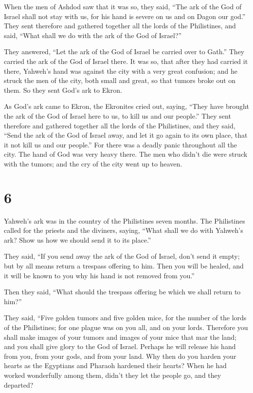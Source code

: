  When the men of Ashdod saw that it was so, they said, ``The
ark of the God of Israel shall not stay with us, for his hand is severe
on us and on Dagon our god.''  They sent therefore and
gathered together all the lords of the Philistines, and said, ``What
shall we do with the ark of the God of Israel?''

They answered, ``Let the ark of the God of Israel be carried over to
Gath.'' They carried the ark of the God of Israel there.  It
was so, that after they had carried it there, Yahweh's hand was against
the city with a very great confusion; and he struck the men of the city,
both small and great, so that tumors broke out on them.  So
they sent God's ark to Ekron.

As God's ark came to Ekron, the Ekronites cried out, saying, ``They have
brought the ark of the God of Israel here to us, to kill us and our
people.''  They sent therefore and gathered together all
the lords of the Philistines, and they said, ``Send the ark of the God
of Israel away, and let it go again to its own place, that it not kill
us and our people.'' For there was a deadly panic throughout all the
city. The hand of God was very heavy there.  The men who
didn't die were struck with the tumors; and the cry of the city went up
to heaven.

\hypertarget{section-5}{%
\section{6}\label{section-5}}

 Yahweh's ark was in the country of the Philistines seven
months.  The Philistines called for the priests and the
diviners, saying, ``What shall we do with Yahweh's ark? Show us how we
should send it to its place.''

 They said, ``If you send away the ark of the God of Israel,
don't send it empty; but by all means return a trespass offering to him.
Then you will be healed, and it will be known to you why his hand is not
removed from you.''

 Then they said, ``What should the trespass offering be
which we shall return to him?''

They said, ``Five golden tumors and five golden mice, for the number of
the lords of the Philistines; for one plague was on you all, and on your
lords.  Therefore you shall make images of your tumors and
images of your mice that mar the land; and you shall give glory to the
God of Israel. Perhaps he will release his hand from you, from your
gods, and from your land.  Why then do you harden your
hearts as the Egyptians and Pharaoh hardened their hearts? When he had
worked wonderfully among them, didn't they let the people go, and they
departed?

